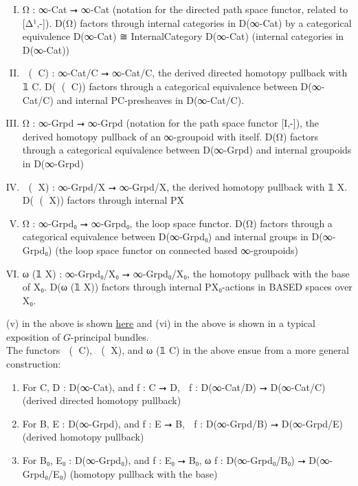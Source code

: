 \documentclass{book}
\theoremstyle{definition}
\begin{document}
\begin{enumerate}[(I)]
\item Ω⃗ : ∞-Cat ⭢ ∞-Cat (notation for the directed path space functor, related to [Δ¹,-]). D(Ω⃗) factors through internal categories in D(∞-Cat) by a categorical equivalence D(∞-Cat) ≅ InternalCategory D(∞-Cat) (internal categories in D(∞-Cat))
\item ω⃗ (𝟙 C) : ∞-Cat/C ⭢ ∞-Cat/C, the derived directed homotopy pullback with 𝟙 C. D(ω⃗ (𝟙 C)) factors through a categorical equivalence between D(∞-Cat/C) and internal P⃗C-presheaves in D(∞-Cat/C).
\item Ω⃡ : ∞-Grpd ⭢ ∞-Grpd (notation for the path space functor [I,-]), the derived homotopy pullback of an ∞-groupoid with itself. D(Ω⃡) factors through a categorical equivalence between D(∞-Grpd) and internal groupoids in D(∞-Grpd)
\item ω⃡ (𝟙 X) : ∞-Grpd/X ⭢ ∞-Grpd/X, the derived homotopy pullback with 𝟙 X. D(ω⃡ (𝟙 X)) factors through internal P⃡X
\item Ω : ∞-Grpd₀ ⭢ ∞-Grpd₀, the loop space functor. D(Ω) factors through a categorical equivalence between D(∞-Grpd₀) and internal groups in D(∞-Grpd₀) (the loop space functor on connected based ∞-groupoids)
\item ω (𝟙 X) : ∞-Grpd₀/X₀ ⭢ ∞-Grpd₀/X₀, the homotopy pullback with the base of X₀. D(ω (𝟙 X)) factors through internal PX₀-actions in BASED spaces over X₀.
\end{enumerate}

(v) in the above is shown \href{https://mathoverflow.net/questions/128883/why-omega-x-and-bg-are-adjoint-functors}{here} and (vi) in the above is shown in a typical exposition of $G$-principal bundles.\\

The functors ω⃗ (𝟙 C), ω⃡ (𝟙 X), and ω (𝟙 C) in the above ensue from a more general construction:\\

\begin{enumerate}
\item For C, D : D(∞-Cat), and f : C ⭢ D, ω⃗ f : D(∞-Cat/D) ⭢ D(∞-Cat/C)   (derived directed homotopy pullback)
\item For B, E : D(∞-Grpd), and f : E ⭢ B, ω⃡ f : D(∞-Grpd/B) ⭢ D(∞-Grpd/E) (derived homotopy pullback)
\item For B₀, E₀ : D(∞-Grpd₀), and f : E₀ ⭢ B₀, ω f : D(∞-Grpd₀/B₀) ⭢ D(∞-Grpd₀/E₀) (homotopy pullback with the base)
\end{enumerate}
\end{document}
